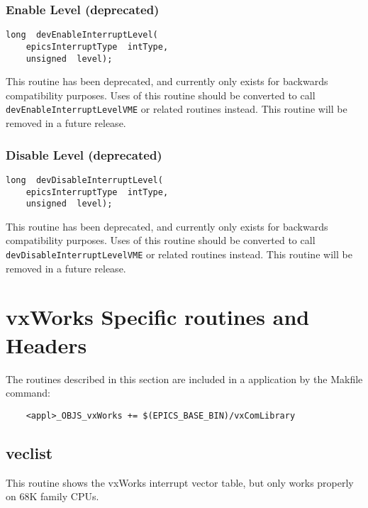 \subsubsection{Enable Level (deprecated)}

\begin{verbatim}
long  devEnableInterruptLevel(
    epicsInterruptType  intType,
    unsigned  level);
\end{verbatim}

This routine has been deprecated, and currently only exists for backwards compatibility purposes. Uses of this routine 
should be converted to call \verb|devEnableInterruptLevelVME| or related routines instead. This routine will be removed 
in a future release.

\subsubsection{Disable Level (deprecated)}

\begin{verbatim}
long  devDisableInterruptLevel(
    epicsInterruptType  intType,
    unsigned  level);
\end{verbatim}

This routine has been deprecated, and currently only exists for backwards compatibility purposes. Uses of this routine 
should be converted to call \verb|devDisableInterruptLevelVME| or related routines instead. This routine will be 
removed in a future release.

\section{vxWorks Specific routines and Headers}

The routines described in this section are included in a application by the Makfile command:

\begin{verbatim}
    <appl>_OBJS_vxWorks += $(EPICS_BASE_BIN)/vxComLibrary
\end{verbatim}

\subsection{veclist}

This routine shows the vxWorks interrupt vector table, but only works properly on 68K family CPUs.

